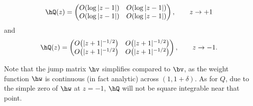 \begin{enumerate}[(i)]
\begin{align*}
 \hQ(z) = \begin{pmatrix}
 O(\log|z-1|) & O(\log|z-1|)
 \\
 O(\log|z-1|) & O(\log|z-1|)
 \end{pmatrix}, \qquad z\to +1
\end{align*}
and
\begin{align*}
 \hQ(z) = \begin{pmatrix}
 O\big(|z+1|^{-1/2}\big) & O\big(|z+1|^{-1/2}\big)
 \\
 O\big(|z+1|^{-1/2}\big) & O\big(|z+1|^{-1/2}\big)
 \end{pmatrix}, \qquad z \to -1.
\end{align*}
\end{enumerate}

Note that the jump matrix $\hv$ simplifies compared to $\bv$, as the weight function $\hw$ is continuous (in fact analytic) across $(1, 1+\delta)$. As for $Q$, due to the simple zero of $\hw$ at $z = -1$, $\hQ$ will not be square integrable near that point.

